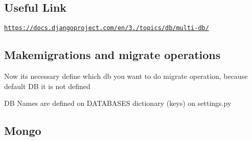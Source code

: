 \subsection*{Useful Link}


\begin{DoxyItemize}
\item \href{https://docs.djangoproject.com/en/3.0/topics/db/multi-db/}{\tt https\+://docs.\+djangoproject.\+com/en/3./topics/db/multi-\/db/}
\end{DoxyItemize}

\subsection*{Makemigrations and migrate operations}


\begin{DoxyItemize}
\item Now its necessary define which db you want to do migrate operation, because default DB it is not defined
\item DB Names are defined on D\+A\+T\+A\+B\+A\+S\+ES dictionary (keys) on settings.\+py
\end{DoxyItemize}




\subsection*{Mongo}


